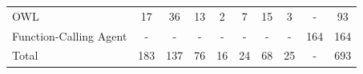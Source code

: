 \begin{table}[t!]
{\begin{tabular}{l||cccccccc|c}
OWL                      & 17                                    & 36                                & 13                                    & 2                                     & 7                                     & 15                                & 3                                & -                                     & 93                                 \\ Function-Calling Agent   & -                                     & -                                 & -                                     & -                                     & -                                     & -                                 & -                                & 164                                   & 164                                \\ \midrule \midrule
Total                    & 183                                   & 137                               & 76                                    & 16                                    & 24                                    & 68                                & 25                               & -                                     & 693                                \\ \bottomrule
\end{tabular}
    }
\end{table}


